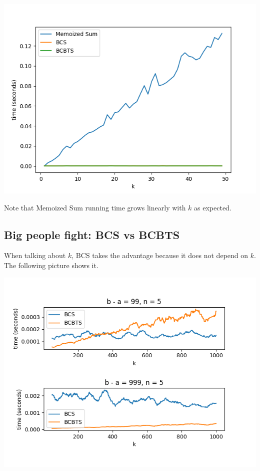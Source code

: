 \documentclass[12pt]{article}
\begin{document}
\begin{center}
    \includegraphics[scale=.8]{assets/2.png}
\end{center}

Note that Memoized Sum running time grows linearly with $k$ as expected.

\subsection{Big people fight: BCS vs BCBTS}

When talking about $k$, BCS takes the advantage because it does not depend on $k$. The following picture shows it.

\includegraphics[scale=1]{assets/3.png}
\end{document}
